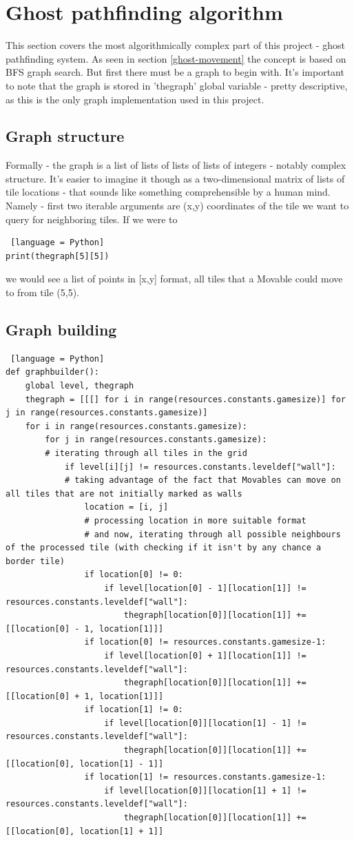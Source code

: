 \documentclass[11pt,a4paper]{report}
\newcommand{\dsubsection}[1]{\FloatBarrier \subsection{#1}}
\begin{document}
		\section{Ghost pathfinding algorithm}
			This section covers the most algorithmically complex part of this project - ghost pathfinding system. As seen in section \ref{ghost-movement} the concept is based on BFS graph search. But first there must be a graph to begin with. It's important to note that the graph is stored in 'thegraph' global variable - pretty descriptive, as this is the only graph implementation used in this project.
			\dsubsection{Graph structure}
				Formally - the graph is a list of lists of lists of lists of integers - notably complex structure. It's easier to imagine it though as a two-dimensional matrix of lists of tile locations - that sounds like something comprehensible by a human mind. Namely - first two iterable arguments are (x,y) coordinates of the tile we want to query for neighboring tiles. If we were to
				\begin{lstlisting} [language = Python]
print(thegraph[5][5])
				\end{lstlisting}
				we would see a list of points in [x,y] format, all tiles that a Movable could move to from tile (5,5).
			\dsubsection{Graph building}
				\begin{lstlisting} [language = Python]
def graphbuilder():
	global level, thegraph
	thegraph = [[[] for i in range(resources.constants.gamesize)] for j in range(resources.constants.gamesize)]
	for i in range(resources.constants.gamesize):
		for j in range(resources.constants.gamesize):
		# iterating through all tiles in the grid
			if level[i][j] != resources.constants.leveldef["wall"]:
			# taking advantage of the fact that Movables can move on all tiles that are not initially marked as walls
				location = [i, j]
				# processing location in more suitable format
				# and now, iterating through all possible neighbours of the processed tile (with checking if it isn't by any chance a border tile)
				if location[0] != 0:
					if level[location[0] - 1][location[1]] != resources.constants.leveldef["wall"]:
						thegraph[location[0]][location[1]] += [[location[0] - 1, location[1]]]
				if location[0] != resources.constants.gamesize-1:
					if level[location[0] + 1][location[1]] != resources.constants.leveldef["wall"]:
						thegraph[location[0]][location[1]] += [[location[0] + 1, location[1]]]
				if location[1] != 0:
					if level[location[0]][location[1] - 1] != resources.constants.leveldef["wall"]:
						thegraph[location[0]][location[1]] += [[location[0], location[1] - 1]]
				if location[1] != resources.constants.gamesize-1:
					if level[location[0]][location[1] + 1] != resources.constants.leveldef["wall"]:
						thegraph[location[0]][location[1]] += [[location[0], location[1] + 1]]
				\end{lstlisting}
\end{document}
